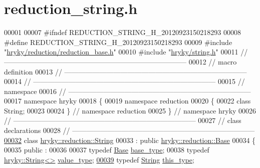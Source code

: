 \hypertarget{reduction__string_8h_source}{\section{reduction\-\_\-string.\-h}
}

\begin{DoxyCode}
00001 
00007 \textcolor{preprocessor}{#ifndef REDUCTION\_STRING\_H\_20120923150218293}
00008 \textcolor{preprocessor}{}\textcolor{preprocessor}{#define REDUCTION\_STRING\_H\_20120923150218293}
00009 \textcolor{preprocessor}{}\textcolor{preprocessor}{#include "\hyperlink{reduction__base_8h}{hryky/reduction/reduction_base.h}"}
00010 \textcolor{preprocessor}{#include "\hyperlink{string_8h}{hryky/string.h}"}
00011 \textcolor{comment}{//
      ------------------------------------------------------------------------------}
00012 \textcolor{comment}{// macro definition}
00013 \textcolor{comment}{//
      ------------------------------------------------------------------------------}
00014 \textcolor{comment}{//
      ------------------------------------------------------------------------------}
00015 \textcolor{comment}{// namespace}
00016 \textcolor{comment}{//
      ------------------------------------------------------------------------------}
00017 \textcolor{keyword}{namespace }hryky
00018 \{
00019 \textcolor{keyword}{namespace }reduction
00020 \{
00022     \textcolor{keyword}{class }String;
00023 
00024 \} \textcolor{comment}{// namespace reduction}
00025 \} \textcolor{comment}{// namespace hryky}
00026 \textcolor{comment}{//
      ------------------------------------------------------------------------------}
00027 \textcolor{comment}{// class declarations}
00028 \textcolor{comment}{//
      ------------------------------------------------------------------------------}
\hypertarget{reduction__string_8h_source_l00032}{}\hyperlink{classhryky_1_1reduction_1_1_string}{00032} \textcolor{comment}{}\textcolor{keyword}{class }\hyperlink{classhryky_1_1reduction_1_1_string}{hryky::reduction::String}
00033     : \textcolor{keyword}{public} \hyperlink{classhryky_1_1reduction_1_1_base}{hryky::reduction::Base}
00034 \{
00035 \textcolor{keyword}{public} :
00036 
00037     \textcolor{keyword}{typedef} \hyperlink{classhryky_1_1reduction_1_1_base}{Base}            \hyperlink{classhryky_1_1reduction_1_1_base}{base_type};
00038     \textcolor{keyword}{typedef} \hyperlink{classhryky_1_1_string}{hryky::String<>} \hyperlink{classhryky_1_1_string}{value_type};
\hypertarget{reduction__string_8h_source_l00039}{}\hyperlink{classhryky_1_1reduction_1_1_string_a29b0205072da7ad98f157a214080cc93}{00039}     \textcolor{keyword}{typedef} \hyperlink{classhryky_1_1reduction_1_1_string}{String}          \hyperlink{classhryky_1_1reduction_1_1_string_a29b0205072da7ad98f157a214080cc93}{this_type};

\end{DoxyCode}
